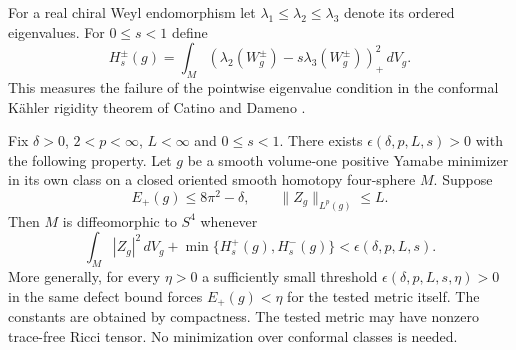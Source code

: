 For a real chiral Weyl endomorphism let \(\lambda_1\le\lambda_2\le
\lambda_3\) denote its ordered eigenvalues. For \(0\le s<1\) define
\[
 H_s^\pm(g)=\int_M
    (\lambda_2(W^\pm_g)-s\lambda_3(W^\pm_g))_+^2\,dV_g .
\]
This measures the failure of the pointwise eigenvalue condition in the
conformal K\"ahler rigidity theorem of Catino and Dameno
\cite[Theorem 1.4]{CatinoDameno2026ConformalKahler}.

\begin{theorem}
\label{thm:near-einstein-recognition}
Fix \(\delta>0\), \(2<p<\infty\), \(L<\infty\) and \(0\le s<1\).
There exists \(\epsilon(\delta,p,L,s)>0\) with the following property.
Let \(g\) be a smooth volume-one positive Yamabe minimizer in its own
class on a closed oriented smooth homotopy four-sphere \(M\). Suppose
\[
 E_+(g)\le8\pi^2-\delta,\qquad \|Z_g\|_{L^p(g)}\le L .
\]
Then \(M\) is diffeomorphic to \(S^4\) whenever
\[
 \int_M|Z_g|^2\,dV_g+\min\{H_s^+(g),H_s^-(g)\}<\epsilon(\delta,p,L,s).
\]
More generally, for every \(\eta>0\) a sufficiently small threshold
\(\epsilon(\delta,p,L,s,\eta)>0\) in the same defect bound forces
\(E_+(g)<\eta\) for the tested metric itself. The constants are
obtained by compactness. The tested metric may have
nonzero trace-free Ricci tensor. No minimization over conformal classes
is needed.
\end{theorem}

